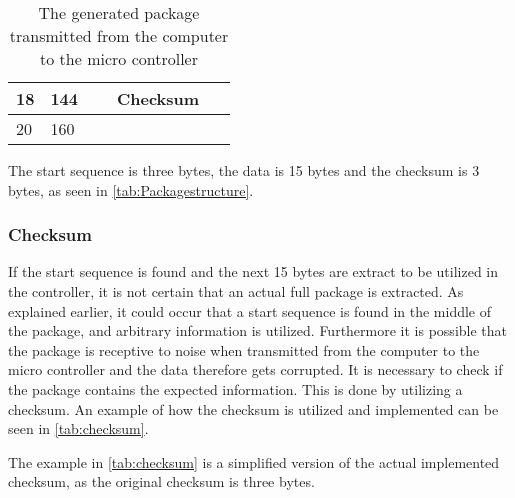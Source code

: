 \begin{table}[H]
\begin{tabular}{llclllllllllllllll}
\multicolumn{1}{|l|}{18}   & \multicolumn{1}{l|}{144} & \multicolumn{16}{c|}{Checksum}                                                                                                                                                                                                                                                                                                                                                                                      \\ \hline
\multicolumn{1}{|l|}{20}   & \multicolumn{1}{l|}{160} & \multicolumn{8}{c|}{}                                                                                                                                                                                 & \multicolumn{1}{l|}{}  & \multicolumn{1}{l|}{}  & \multicolumn{1}{l|}{}   & \multicolumn{1}{l|}{}   & \multicolumn{1}{l|}{}   & \multicolumn{1}{l|}{}   & \multicolumn{1}{l|}{}   & \multicolumn{1}{l|}{}   \\ \hline
\end{tabular}
\label{tab:Packagestructure}
\caption{The generated package transmitted from the computer to the micro controller}
\end{table}

The start sequence is three bytes, the data is 15 bytes and the checksum is 3 bytes, as seen in \autoref{tab:Packagestructure}.
\subsubsection{Checksum}
If the start sequence is found and the next 15 bytes are extract to be utilized in the controller, it is not certain that an actual full package is extracted. As explained earlier, it could occur that a start sequence is found in the middle of the package, and arbitrary information is utilized. Furthermore it is possible that the package is receptive to noise when transmitted from the computer to the micro controller and the data therefore gets corrupted. It is necessary to check if the package contains the expected information. This is done by utilizing a checksum. An example of how the checksum is utilized and implemented can be seen in \autoref{tab:checksum}.  

The example in \autoref{tab:checksum} is a simplified version of the actual implemented checksum, as the original checksum is three bytes. 

